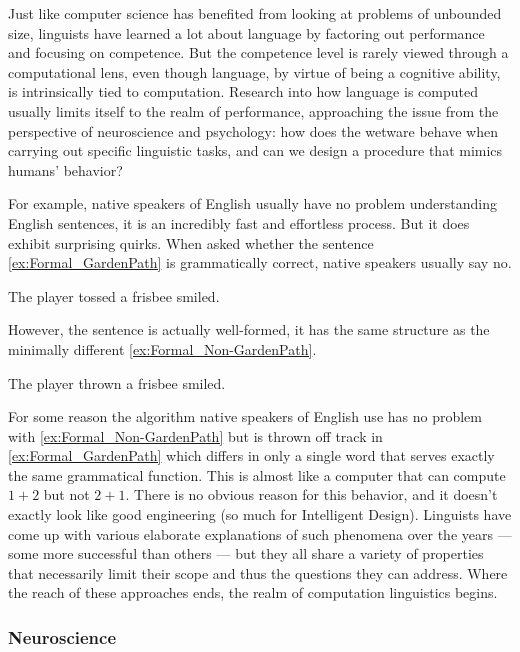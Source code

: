 Just like computer science has benefited from looking at problems of unbounded size, linguists have learned a lot about language by factoring out performance and focusing on competence.
But the competence level is rarely viewed through a computational lens, even though language, by virtue of being a cognitive ability, is intrinsically tied to computation.
Research into how language is computed usually limits itself to the realm of performance, approaching the issue from the perspective of neuroscience and psychology: how does the wetware behave when carrying out specific linguistic tasks, and can we design a procedure that mimics humans' behavior?

For example, native speakers of English usually have no problem understanding English sentences, it is an incredibly fast and effortless process.
But it does exhibit surprising quirks.
When asked whether the sentence \eqref{ex:Formal_GardenPath} is grammatically correct, native speakers usually say no.
%
\begin{exe}
        \ex The player tossed a frisbee smiled.\label{ex:Formal_GardenPath}
\end{exe}
%
However, the sentence is actually well-formed, it has the same structure as the minimally different \eqref{ex:Formal_Non-GardenPath}. 
%
\begin{exe}
    \ex The player thrown a frisbee smiled.\label{ex:Formal_Non-GardenPath}
\end{exe}
%
For some reason the algorithm native speakers of English use has no problem with \eqref{ex:Formal_Non-GardenPath} but is thrown off track in \eqref{ex:Formal_GardenPath} which differs in only a single word that serves exactly the same grammatical function.
This is almost like a computer that can compute $1 + 2$ but not $2 + 1$.
There is no obvious reason for this behavior, and it doesn't exactly look like good engineering (so much for Intelligent Design).
Linguists have come up with various elaborate explanations of such phenomena over the years --- some more successful than others ---
but they all share a variety of properties that necessarily limit their scope and thus the questions they can address.
Where the reach of these approaches ends, the realm of computation linguistics begins.

\subsubsection{Neuroscience}
\label{sub:formal_arguments_science_neuro}

